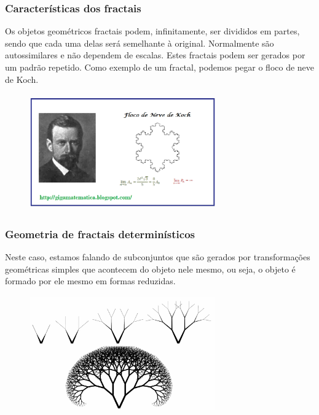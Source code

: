 \documentclass{beamer}
\begin{document}
\begin{frame}
\frametitle{Características dos fractais}
Os objetos geométricos fractais podem, infinitamente, ser divididos em partes, sendo que cada uma delas será semelhante à original. Normalmente são autossimilares e não dependem de escalas. Estes fractais podem ser gerados por um padrão repetido. Como exemplo de um fractal, podemos pegar o floco de neve de Koch.
\end{frame}
\begin{frame}
	\begin{figure}[htb]
	\centering
    	    \includegraphics[width=8cm, height=5cm]{images/floco-neve.jpg}
       	        \vspace{0.01em}
	\end{figure}
\end{frame}
\begin{frame}
\frametitle{Geometria de fractais determinísticos}
Neste caso, estamos falando de subconjuntos que são gerados por transformações geométricas simples que acontecem do objeto nele mesmo, ou seja, o objeto é formado por ele mesmo em formas reduzidas.
\end{frame}
\begin{frame}
	\begin{figure}[htb]
	\centering
    	    \includegraphics[width=8cm, height=5cm]{images/arvore.jpg}
       	        \vspace{0.01em}
	\end{figure}
\end{frame}
\end{document}
